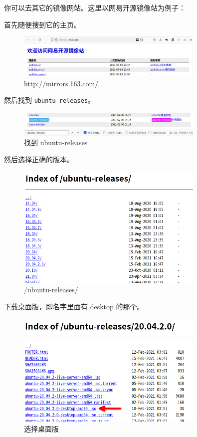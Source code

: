 \documentclass[UTF-8]{ctexart}
\begin{document}
				你可以去其它的镜像网站。这里以网易开源镜像站为例子：
				
				首先随便搜到它的主页。
				
				\begin{figure}[H]
					\centering
					\includegraphics[width=0.8\textwidth]{fig/mirrors163com.png}
					\caption*{http://mirrors.163.com/}
				\end{figure}
			
				然后找到 \texttt{ubuntu-releases}。
				
				\begin{figure}[H]
					\centering
					\includegraphics[width=0.8\textwidth]{fig/mirrors163com_find.png}
					\caption*{找到 ubuntu-releases}
				\end{figure}
				
				然后选择正确的版本。
				
				\begin{figure}[H]
					\centering
					\includegraphics[width=0.8\textwidth]{fig/mirrors163com_in_ubuntu-releases.png}
					\caption*{/ubuntu-releases/}
				\end{figure}
			
				下载桌面版，即名字里面有 desktop 的那个。
				
				\begin{figure}[H]
					\centering
					\includegraphics[width=0.8\textwidth]{fig/mirrors163com_choose_ubuntu-releases.png}
					\caption*{选择桌面版}
				\end{figure}
			
\end{document}

